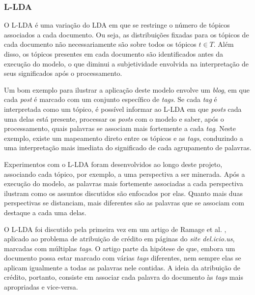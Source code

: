 \subsubsection{L-LDA}

O L-LDA é uma variação do LDA em que se restringe o número de tópicos associados a cada documento. Ou seja, as distribuições fixadas para os tópicos de cada documento não necessariamente são sobre todos os tópicos \ensuremath{t \in T}. Além disso, os tópicos presentes em cada documento são identificados antes da execução do modelo, o que diminui a subjetividade envolvida na interpretação de seus significados após o processamento. 

Um bom exemplo para ilustrar a aplicação deste modelo envolve um \emph{blog}, em que cada \emph{post} é marcado com um conjunto específico de \emph{tags}. Se cada \emph{tag} é interpretada como um tópico, é possível informar ao L-LDA em que \emph{posts} cada uma delas está presente, processar os \emph{posts} com o modelo e saber, após o processamento, quais palavras se associam mais fortemente a cada \emph{tag}. Neste exemplo, existe um mapeamento direto entre os tópicos e as \emph{tags}, conduzindo a uma interpretação mais imediata do significado de cada agrupamento de palavras.

Experimentos com o L-LDA foram desenvolvidos ao longo deste projeto, associando cada tópico, por exemplo, a uma perspectiva a ser minerada. Após a execução do modelo, as palavras mais fortemente associadas a cada perspectiva ilustram como os assuntos discutidos são enfocados por elas. Quanto mais duas perspectivas se distanciam, mais diferentes são as palavras que se associam com destaque a cada uma delas.

O L-LDA foi discutido pela primeira vez em um artigo de Ramage et al. \cite{llda}, aplicado ao problema de atribuição de crédito em páginas do \emph{site del.icio.us}, marcadas com múltiplas \emph{tags}. O artigo parte da hipótese de que, embora um documento possa estar marcado com várias \emph{tags} diferentes, nem sempre elas se aplicam igualmente a todas as palavras nele contidas. A ideia da atribuição de crédito, portanto, consiste em associar cada palavra do documento às \emph{tags} mais apropriadas e vice-versa. 


